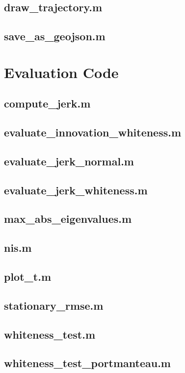 \subsection{draw\_trajectory.m}

\subsection{save\_as\_geojson.m}


\section{Evaluation Code}
\subsection{compute\_jerk.m}

\subsection{evaluate\_innovation\_whiteness.m}

\subsection{evaluate\_jerk\_normal.m}

\subsection{evaluate\_jerk\_whiteness.m}

\subsection{max\_abs\_eigenvalues.m}

\subsection{nis.m}

\subsection{plot\_t.m}

\subsection{stationary\_rmse.m}

\subsection{whiteness\_test.m}

\subsection{whiteness\_test\_portmanteau.m}


